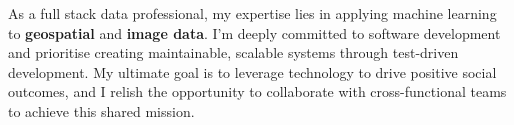 As a full stack data professional, my expertise lies in applying machine learning to \textbf{geospatial} and \textbf{image data}. I'm deeply committed to software development and prioritise creating maintainable, scalable systems through test-driven development. My ultimate goal is to leverage technology to drive positive social outcomes, and I relish the opportunity to collaborate with cross-functional teams to achieve this shared mission.
